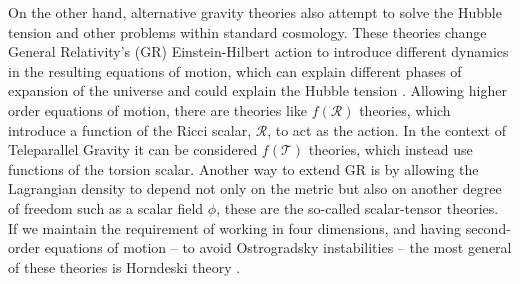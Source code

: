 \documentclass[onecolumn,superscriptaddress,secnumarabic,amssymb,amsmath,nobibnotes,aps,prd,nofootinbib,altaffilletter]{revtex4}
\begin{document}
On the other hand, alternative gravity theories also attempt to solve the Hubble tension and other problems within standard cosmology. These theories change General Relativity's (GR) Einstein-Hilbert action to introduce different dynamics in the resulting equations of motion, which can explain different phases of expansion of the universe and could explain the Hubble tension \cite{Kobayashi_2019, Clifton:2011jh}. Allowing higher order equations of motion, there are theories like $f(\mathcal{R})$ theories, which introduce a function of the Ricci scalar, $\mathcal R$, to act as the action. In the context of Teleparallel Gravity \cite{Bahamonde:2021gfp} it can be considered $f(\mathcal{T})$ theories, which instead use functions of the torsion scalar. Another way to extend GR is by allowing the Lagrangian density to depend not only on the metric but also on another degree of freedom such as a scalar field $\phi$, these are the so-called scalar-tensor theories. If we maintain the requirement of working in four dimensions, and having second-order equations of motion -- to avoid Ostrogradsky instabilities \cite{Kobayashi_2019}-- the most general of these theories is Horndeski theory \cite{Charmousis_2012,Horndeski:1974wa}.
\end{document}
